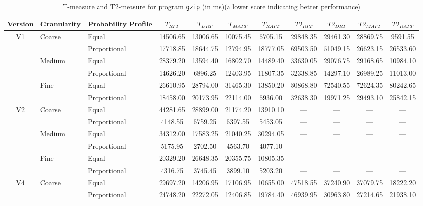 \documentclass[10pt,journal,compsoc]{IEEEtran}
\begin{document}
\begin{table*}
\caption{T-measure and T2-measure for program \texttt{gzip} (in ms)(a lower score indicating better performance)}
\label{tab:Tgzip}
\centering
\begin{tabular}{|c|l|l|c|c|c|c|c|c|c|c|} \hline
Version	& Granularity	& Probability Profile	& $T_{RPT}$	& $T_{DRT}$	& $T_{MAPT}$	& $T_{RAPT}$	& $T2_{RPT}$	& $T2_{DRT}$	& $T2_{MAPT}$	 & $T2_{RAPT}$	\\ \hline
V1	& Coarse	& Equal	& 14506.65	& 13006.65	& 10075.45	& 6705.15	& 29848.35	& 29461.30	& 28869.75	& 9591.55	 \\ \cline{3-11}
	& 	& Proportional	& 17718.85	& 18644.75	& 12794.95	& 18777.05	& 69503.50	& 51049.15	& 26623.15	& 26533.60	 \\ \cline{2-11}
	& Medium	& Equal	& 28379.20	& 13594.40	& 16802.70	& 14489.40	& 33630.05	& 29076.75	& 29168.65	& 10984.10	 \\ \cline{3-11}
	& 	& Proportional	& 14626.20	& 6896.25	& 12403.95	& 11807.35	& 32338.85	& 14297.10	& 26989.25	& 11013.00	 \\ \cline{2-11}
	& Fine	& Equal	& 26610.95	& 28794.00	& 31465.30	& 13850.20	& 80868.80	& 72540.55	& 72624.35	& 80242.65	 \\ \cline{3-11}
	& 	& Proportional	& 18458.00	& 20173.95	& 22114.00	& 6936.00	& 32638.30	& 19971.25	& 29493.10	& 25842.15	 \\ \hline
V2	& Coarse	& Equal	& 44281.65	& 28899.00	& 21174.20	& 13910.10	& ---	& ---	& ---	& ---	 \\ \cline{3-11}
	& 	& Proportional	& 4148.55	& 5759.25	& 5397.55	& 5453.05	& ---	& ---	& ---	& ---	 \\ \cline{2-11}
	& Medium	& Equal	& 34312.00	& 17583.25	& 21040.25	& 30294.05	& ---	& ---	& ---	& ---	 \\ \cline{3-11}
	& 	& Proportional	& 5175.95	& 2702.50	& 4563.70	& 4077.10	& ---	& ---	& ---	& ---	 \\ \cline{2-11}
	& Fine	& Equal	& 20329.20	& 26648.35	& 20355.75	& 10805.35	& ---	& ---	& ---	& ---	 \\ \cline{3-11}
	& 	& Proportional	& 4316.75	& 3745.45	& 3899.10	& 5203.20	& ---	& ---	& ---	& ---	 \\ \hline
V4	& Coarse	& Equal	& 29697.20	& 14206.95	& 17106.95	& 10655.00	& 47518.55	& 37240.90	& 37079.75	& 18222.20	 \\ \cline{3-11}
	& 	& Proportional	& 24748.20	& 22272.05	& 12406.85	& 19784.40	& 46939.95	& 30963.80	& 27214.65	& 21938.10	 \\ \cline{2-11}

\end{tabular}
\end{table*}
\end{document}
